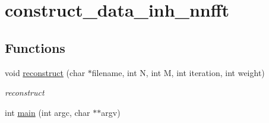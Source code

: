 \hypertarget{group__applications__mri2d__construct__data__inh__nnfft}{
\section{construct\_\-data\_\-inh\_\-nnfft}
\label{group__applications__mri2d__construct__data__inh__nnfft}
}
\subsection*{Functions}
\begin{CompactItemize}
\item 
\hypertarget{group__applications__mri2d__construct__data__inh__nnfft_g43c01bb9865574fcfee9a1f999713987}{
void \hyperlink{group__applications__mri2d__construct__data__inh__nnfft_g43c01bb9865574fcfee9a1f999713987}{reconstruct} (char $\ast$filename, int N, int M, int iteration, int weight)}
\label{group__applications__mri2d__construct__data__inh__nnfft_g43c01bb9865574fcfee9a1f999713987}

\begin{CompactList}\small\item\em reconstruct \item\end{CompactList}\item 
\hypertarget{group__applications__mri2d__construct__data__inh__nnfft_g3c04138a5bfe5d72780bb7e82a18e627}{
int \hyperlink{group__applications__mri2d__construct__data__inh__nnfft_g3c04138a5bfe5d72780bb7e82a18e627}{main} (int argc, char $\ast$$\ast$argv)}
\label{group__applications__mri2d__construct__data__inh__nnfft_g3c04138a5bfe5d72780bb7e82a18e627}

\end{CompactItemize}
